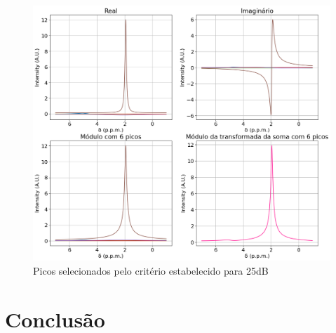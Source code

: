 \documentclass[12pt]{article}
\begin{document}
\begin{figure} [H]
    \centering
    \includegraphics[scale=0.5]{real-imag-modulo-25.png}
    \caption{Picos selecionados pelo critério estabelecido para 25dB}
    \label{fig:16}
\end{figure}
 
\section{Conclusão}






\end{document}

